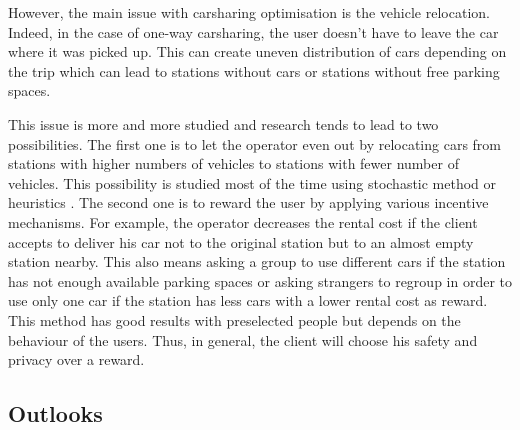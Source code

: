 \begin{bibunit}[ieeetr]
However, the main issue with carsharing optimisation is the vehicle relocation.
Indeed, in the case of one-way carsharing, the user doesn't have to leave the car where it was picked up.
This can create uneven distribution of cars depending on the trip which can lead to stations without cars or stations without free parking spaces.

This issue is more and more studied and research tends to lead to two possibilities.
The first one is to let the operator even out by relocating cars from stations with higher numbers of vehicles to stations with fewer number of vehicles.
This possibility is studied most of the time using stochastic method \cite{fan_optimizing_2014} or heuristics \cite{duron_analysis_2000}.
The second one is to reward the user by applying various incentive mechanisms.
For example, the operator decreases the rental cost if the client accepts to deliver his car not to the original station but to an almost empty station nearby.
This also means asking a group to use different cars if the station has not enough available parking spaces or asking strangers to regroup in order to use only one car if the station has less cars with a lower rental cost as reward.
This method has good results with preselected people but depends on the behaviour of the users.
Thus, in general, the client will choose his safety and privacy over a reward.



\subsection{Outlooks}


\end{bibunit}
